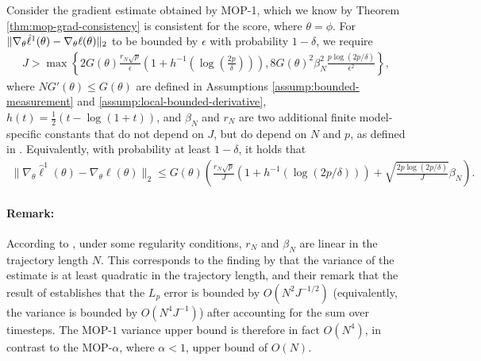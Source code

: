 \begin{lem}
    \label{lemma:grad_bound}
    Consider the gradient estimate obtained by MOP-1, which we know by Theorem \ref{thm:mop-grad-consistency} is consistent for the score, where $\theta = \phi$. For $\|\nabla_\theta \hat{\ell}^1(\theta) - \nabla_\theta \ell(\theta)\|_2$ to be bounded by $\epsilon$ with probability $1-\delta$, we require
    \begin{align}
    J > \max\left\{2G(\theta)\frac{r_N\sqrt{p}}{\epsilon}\left(1+h^{-1}\left(\log\left(\frac{2p}{\delta}\right)\right)\right), 8G(\theta)^2\beta_N^2\frac{p\log(2p/\delta)}{\epsilon^2}\right\},
    \end{align}
    where $NG'(\theta) \leq G(\theta)$ are defined in Assumptions \ref{assump:bounded-measurement} and \ref{assump:local-bounded-derivative}, $h(t) = \frac{1}{2}(t - \log(1+t))$, and $\beta_N$ and $r_N$ are two additional finite model-specific constants that do not depend on $J$, but do depend on $N$ and $p$, as defined in \cite{delMoral11}. 
Equivalently, with probability at least $1-\delta$, it holds that
    \begin{align}
        \|\nabla_\theta \hat\ell^1(\theta) - \nabla_\theta \ell(\theta)\|_2 \leq G(\theta)\left(\frac{r_N\sqrt{p}}{J}(1+h^{-1}(\log(2p/\delta))) + \sqrt{\frac{2p\log(2p/\delta)}{J}}\beta_N\right).
    \end{align}
\end{lem}

\paragraph{Remark:} According to \cite{delMoral11}, under some regularity conditions, $r_N$ and $\beta_N$ are linear in the trajectory length $N$. This corresponds to the finding by \cite{poyiadjis11} that the variance of the estimate is at least quadratic in the trajectory length, and their remark that the result of \cite{delMoral03} establishes that the $L_p$ error is bounded by $O(N^2J^{-1/2})$ (equivalently, the variance is bounded by $O(N^4J^{-1})$) after accounting for the sum over timesteps. The MOP-$1$ variance upper bound is therefore in fact $O(N^4)$, in contrast to the MOP-$\alpha$, where $\alpha<1$, upper bound of $O(N)$. 



